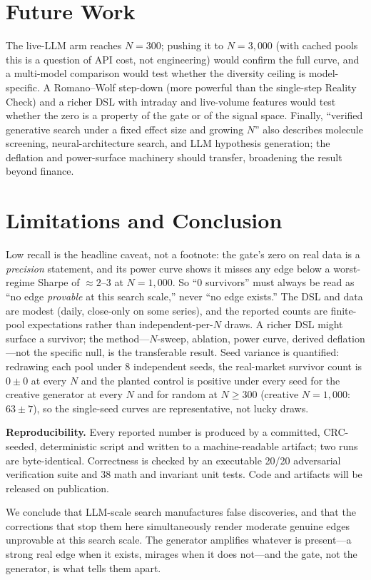 \documentclass[sigconf]{acmart}
\begin{document}
\section{Future Work}
The live-LLM arm reaches $N{=}300$; pushing it to $N{=}3{,}000$ (with cached pools this is a question of API cost, not engineering) would confirm the full curve, and a multi-model comparison would test whether the diversity ceiling is model-specific. A Romano--Wolf step-down (more powerful than the single-step Reality Check) and a richer DSL with intraday and live-volume features would test whether the zero is a property of the gate or of the signal space. Finally, ``verified generative search under a fixed effect size and growing $N$'' also describes molecule screening, neural-architecture search, and LLM hypothesis generation; the deflation and power-surface machinery should transfer, broadening the result beyond finance.

\section{Limitations and Conclusion}
Low recall is the headline caveat, not a footnote: the gate's zero on real data is a \emph{precision} statement, and its power curve shows it misses any edge below a worst-regime Sharpe of ${\approx}2$--$3$ at $N{=}1{,}000$. So ``0 survivors'' must always be read as ``no edge \emph{provable} at this search scale,'' never ``no edge exists.'' The DSL and data are modest (daily, close-only on some series), and the reported counts are finite-pool expectations rather than independent-per-$N$ draws. A richer DSL might surface a survivor; the method---$N$-sweep, ablation, power curve, derived deflation---not the specific null, is the transferable result. Seed variance is quantified: redrawing each pool under 8 independent seeds, the real-market survivor count is $0\pm0$ at every $N$ and the planted control is positive under every seed for the creative generator at every $N$ and for random at $N{\ge}300$ (creative $N{=}1{,}000$: $63\pm7$), so the single-seed curves are representative, not lucky draws.

\textbf{Reproducibility.} Every reported number is produced by a committed, CRC-seeded, deterministic script and written to a machine-readable artifact; two runs are byte-identical. Correctness is checked by an executable 20/20 adversarial verification suite and 38 math and invariant unit tests. Code and artifacts will be released on publication.

We conclude that LLM-scale search manufactures false discoveries, and that the corrections that stop them here simultaneously render moderate genuine edges unprovable at this search scale. The generator amplifies whatever is present---a strong real edge when it exists, mirages when it does not---and the gate, not the generator, is what tells them apart.
\end{document}
